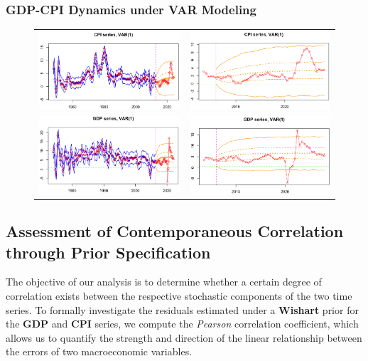 \documentclass{Configuration_Files/PoliMi3i_thesis}
\begin{document}
\subsubsection{GDP-CPI Dynamics under VAR Modeling}
\begin{figure}[H]
  \centering
  \begin{tabular}{@{}cc@{}}
    \includegraphics[angle=90,width=0.35\linewidth]{VAR(1)-33.png} &
    \includegraphics[angle=90,width=0.35\linewidth]{VAR(1)-44.png} \\
    \includegraphics[angle=90,width=0.35\linewidth]{VAR(1)-11.png} &
    \includegraphics[angle=90,width=0.35\linewidth]{VAR(1)-22.png}
  \end{tabular}
\end{figure}



\subsection*{Assessment of Contemporaneous Correlation through Prior Specification}

The objective of our analysis is to determine whether a certain degree of correlation exists between the respective stochastic components of the two time series. To formally investigate the residuals estimated under a \textbf{\textbf{Wishart}} prior for the \textbf{GDP} and \textbf{CPI} series, we compute the \textit{Pearson} correlation coefficient, which allows us to quantify the strength and direction of the linear relationship between the errors of two macroeconomic variables.
\label{Prior-VAR}
\end{document}
